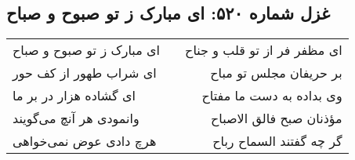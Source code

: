 \begin{center}
\section*{غزل شماره ۵۲۰: ای مبارک ز تو صبوح و صباح}
\label{sec:0520}
\begin{longtable}{l p{0.5cm} r}
ای مبارک ز تو صبوح و صباح
&&
ای مظفر فر از تو قلب و جناح
\\
ای شراب طهور از کف حور
&&
بر حریفان مجلس تو مباح
\\
ای گشاده هزار در بر ما
&&
وی بداده به دست ما مفتاح
\\
وانمودی هر آنچ می‌گویند
&&
مؤذنان صبح فالق الاصباح
\\
هرچ دادی عوض نمی‌خواهی
&&
گر چه گفتند السماح رباح
\\
\end{longtable}
\end{center}
